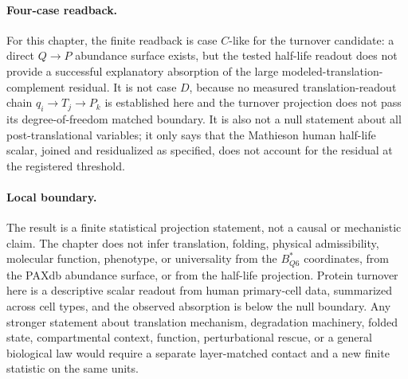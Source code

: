 \paragraph{Four-case readback.}
For this chapter, the finite readback is case $C$-like for the turnover candidate: a direct $Q\to P$ abundance surface exists, but the tested half-life readout does not provide a successful explanatory absorption of the large modeled-translation-complement residual.  It is not case $D$, because no measured translation-readout chain $q_i\to T_j\to P_k$ is established here and the turnover projection does not pass its degree-of-freedom matched boundary.  It is also not a null statement about all post-translational variables; it only says that the Mathieson human half-life scalar, joined and residualized as specified, does not account for the residual at the registered threshold.

\paragraph{Local boundary.}
The result is a finite statistical projection statement, not a causal or mechanistic claim.  The chapter does not infer translation, folding, physical admissibility, molecular function, phenotype, or universality from the $B^{\ast}_{Q6}$ coordinates, from the PAXdb abundance surface, or from the half-life projection.  Protein turnover here is a descriptive scalar readout from human primary-cell data, summarized across cell types, and the observed absorption is below the null boundary.  Any stronger statement about translation mechanism, degradation machinery, folded state, compartmental context, function, perturbational rescue, or a general biological law would require a separate layer-matched contact and a new finite statistic on the same units.